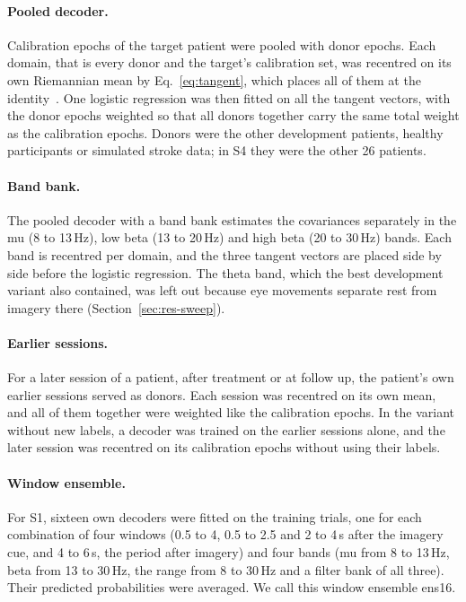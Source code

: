 \documentclass[pdflatex,sn-mathphys-num]{sn-jnl}
\begin{document}
\paragraph{Pooled decoder.} Calibration epochs of the target patient were pooled with donor epochs. Each domain, that is every donor and the target's calibration set, was recentred on its own Riemannian mean by Eq.~\eqref{eq:tangent}, which places all of them at the identity~\cite{zanini2018}. One logistic regression was then fitted on all the tangent vectors, with the donor epochs weighted so that all donors together carry the same total weight as the calibration epochs. Donors were the other development patients, healthy participants or simulated stroke data; in S4 they were the other 26 patients.

\paragraph{Band bank.} The pooled decoder with a band bank estimates the covariances separately in the mu (8 to 13\,Hz), low beta (13 to 20\,Hz) and high beta (20 to 30\,Hz) bands. Each band is recentred per domain, and the three tangent vectors are placed side by side before the logistic regression. The theta band, which the best development variant also contained, was left out because eye movements separate rest from imagery there (Section~\ref{sec:res-sweep}).

\paragraph{Earlier sessions.} For a later session of a patient, after treatment or at follow up, the patient's own earlier sessions served as donors. Each session was recentred on its own mean, and all of them together were weighted like the calibration epochs. In the variant without new labels, a decoder was trained on the earlier sessions alone, and the later session was recentred on its calibration epochs without using their labels.

\paragraph{Window ensemble.} For S1, sixteen own decoders were fitted on the training trials, one for each combination of four windows (0.5 to 4, 0.5 to 2.5 and 2 to 4\,s after the imagery cue, and 4 to 6\,s, the period after imagery) and four bands (mu from 8 to 13\,Hz, beta from 13 to 30\,Hz, the range from 8 to 30\,Hz and a filter bank of all three). Their predicted probabilities were averaged. We call this window ensemble ens16.
\end{document}
